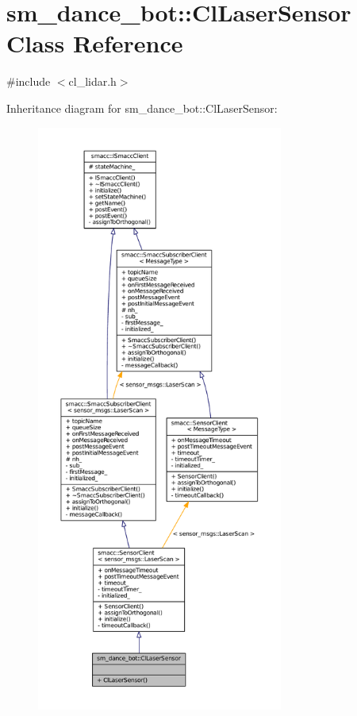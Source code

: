 \hypertarget{classsm__dance__bot_1_1ClLaserSensor}{}\section{sm\+\_\+dance\+\_\+bot\+:\+:Cl\+Laser\+Sensor Class Reference}
\label{classsm__dance__bot_1_1ClLaserSensor}


{\ttfamily \#include $<$cl\+\_\+lidar.\+h$>$}



Inheritance diagram for sm\+\_\+dance\+\_\+bot\+:\+:Cl\+Laser\+Sensor\+:
\nopagebreak
\begin{figure}[H]
\begin{center}
\leavevmode
\includegraphics[height=550pt]{classsm__dance__bot_1_1ClLaserSensor__inherit__graph}
\end{center}
\end{figure}


